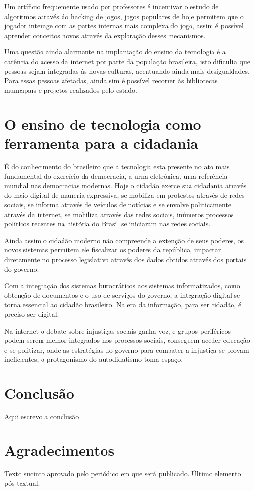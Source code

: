 \documentclass[article, 11pt, oneside, a4paper, english, brazil, sumario=tradicional]{abntex2}
\begin{document}
    Um artíficio frequemente usado por professores é incentivar o estudo de algoritmos através do
hacking de jogos, jogos populares de hoje permitem que o jogador interage com as partes internas
mais complexa do jogo, assim é possível aprender conceitos novos através da exploração desses mecanismos.

    Uma questão ainda alarmante na implantação do ensino da tecnologia é a carência do acesso da internet
por parte da população brasileira, isto dificulta que pessoas sejam integradas às novas culturas, acentuando
ainda mais desigualdades. Para essas pessoas afetadas, ainda sim é possível recorrer às bibliotecas municipais e
projetos realizados pelo estado.

\section{O ensino de tecnologia como ferramenta para a cidadania}

    É do conhecimento do brasileiro que a tecnologia esta presente no
ato mais fundamental do exercício da democracia, a urna eletrônica, uma
referência mundial nas democracias modernas. Hoje o cidadão exerce sua cidadania
através do meio digital de maneria expressiva, se mobiliza em protestos através
de redes sociais, se informa através de veículos de notícias e se envolve politicamente
através da internet, se mobiliza através das redes sociais, inúmeros processos políticos recentes
na história do Brasil se iniciaram nas redes sociais.

    Ainda assim o cidadão moderno não compreende a extenção de seus poderes, os novos sistemas
permitem ele fiscalizar os poderes da república, impactar diretamente no processo legislativo
através dos dados obtidos através dos portais do governo.

    Com a integração dos sistemas burocráticos aos sistemas informatizados, como obtenção de documentos
e o uso de serviços do governo, a integração digital se torna essencial ao cidadão brasileiro. Na era da informação, para ser cidadão, é preciso ser
digital.

    Na internet o debate sobre injustiças sociais ganha voz, e grupos periféricos podem
serem melhor integrados nos processos sociais, conseguem aceder educação e se politizar, onde
as estratégias do governo para combater a injustiça se provam ineficientes, o protagonismo do autodidatismo
toma espaço.


\section{Conclusão}
Aqui escrevo a conclusão


\postextual

\section*{Agradecimentos}
Texto sucinto aprovado pelo periódico em que será publicado. Último
elemento pós-textual.
\end{document}
